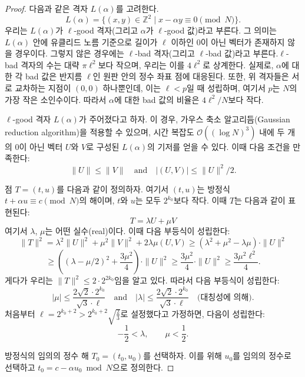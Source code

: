 \begin{proof}
    다음과 같은 격자 $L(\alpha)$를 고려한다.
    $$
        L(\alpha) = \{(x, y) \in \mathbb{Z}^2 \mid x - \alpha y \equiv 0 \pmod{N} \}.
    $$
    우리는 $L(\alpha)$가 $\ell$-good 격자(그리고 $\alpha$가 $\ell$-good 값)라고
    부른다. 그 의미는 $L(\alpha)$ 안에 유클리드 노름 기준으로 길이가 $\ell$
    이하인 $0$이 아닌 벡터가 존재하지 않을 경우이다. 그렇지 않은 경우에는
    $\ell$-bad 격자(그리고 $\ell$-bad 값)라고 부른다.$\ell$-bad 격자의 수는 대략
    $\pi \ell^2$보다 작으며, 우리는 이를 $4\ell^2$로 상계한다. 실제로,
    $\alpha$에 대한 각 bad 값은 반지름 $\ell$인 원판 안의 정수 좌표 점에
    대응된다. 또한, 위 격자들은 서로 교차하는 지점이 $(0, 0)$ 하나뿐인데, 이는
    $\ell < p$일 때 성립하며, 여기서 $p$는 $N$의 가장 작은 소인수이다. 따라서
    $\alpha$에 대한 bad 값의 비율은 $4\ell^2 / N$보다 작다.

    $\ell$-good 격자 $L(\alpha)$가 주어졌다고 하자. 이 경우, 가우스 축소
    알고리듬(Gaussian reduction algorithm)을 적용할 수 있으며, 시간 복잡도
    $\mathcal{O}((\log N)^3)$ 내에 두 개의 0이 아닌 벡터 $U$와 $V$로 구성된
    $L(\alpha)$의 기저를 얻을 수 있다.  
    이때 다음 조건을 만족한다:
    $$
        \|U\| \leq \|V\| \quad \text{and} \quad |(U, V)| \leq \|U\|^2 / 2.
    $$

    점 $T = (t, u)$를 다음과 같이 정의하자. 여기서 $(t, u)$는 방정식 $t + \alpha u \equiv c \pmod{N}$의 해이며, 
    $t$와 $u$는 모두 $2^{k_0}$보다 작다. 이때 $T$는 다음과 같이 표현된다:  
    $$
        T = \lambda U + \mu V
    $$
    여기서 $\lambda$, $\mu$는 어떤 실수(real)이다. 이때 다음 부등식이 성립한다:
    $$
    \|T\|^2 = \lambda^2 \|U\|^2 + \mu^2 \|V\|^2 + 2\lambda \mu (U, V) 
    \geq (\lambda^2 + \mu^2 - \lambda \mu) \cdot \|U\|^2
    $$
    $$
    \geq \left((\lambda - \mu/2)^2 + \frac{3\mu^2}{4}\right) \cdot \|U\|^2 
    \geq \frac{3\mu^2}{4} \cdot \|U\|^2 
    \geq \frac{3\mu^2 \ell^2}{4}.
    $$
    게다가 우리는 $\|T\|^2 \leq 2 \cdot 2^{2k_0}$임을 알고 있다. 따라서 다음
    부등식이 성립한다:
    \[
    |\mu| \leq \frac{2\sqrt{2} \cdot 2^{k_0}}{\sqrt{3} \cdot \ell}
    \quad \text{and} \quad
    |\lambda| \leq \frac{2\sqrt{2} \cdot 2^{k_0}}{\sqrt{3} \cdot \ell}
    \quad \text{(대칭성에 의해)}.
    \]
    처음부터 $\ell = 2^{k_0 + 2} > 2^{k_0 + 2} \sqrt{\frac{2}{3}}$로 설정했다고
    가정하면, 다음이 성립한다:
    \[
    -\frac{1}{2} < \lambda, \qquad \mu < \frac{1}{2}.
    \]

    방정식의 임의의 정수 해 $T_0 = (t_0, u_0)$를 선택하자.  
    이를 위해 $u_0$를 임의의 정수로 선택하고 $t_0 = c - \alpha u_0 \bmod N$으로 정의한다.  


\end{proof}

